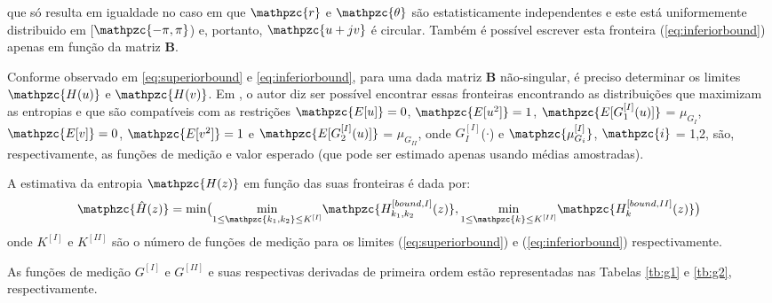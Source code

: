     que só resulta em igualdade no caso em que $\mathpzc{r}$ e $\mathpzc{\theta}$ são estatisticamente independentes e este está uniformemente distribuido em [$\mathpzc{-\pi,\pi}$) e, portanto, $\mathpzc{u + jv}$ é circular. Também é possível escrever esta fronteira (\ref{eq:inferiorbound}) apenas em função da matriz $\mathbf{B}$. 
    
    Conforme observado em \ref{eq:superiorbound} e \ref{eq:inferiorbound}, para uma dada matriz $\mathbf{B}$ não-singular, é preciso determinar os limites $\mathpzc{H(u)}$ e  $\mathpzc{H(v)}$. Em \cite{entropymaximum}, o autor diz ser possível encontrar essas fronteiras encontrando as distribuições que maximizam as entropias e que são compatíveis com as restrições $\mathpzc{E[u]} = 0$, $\mathpzc{E[u^2]} = 1$, $\mathpzc{E[G_1^{[I]}(u)]}$ = $\mu_{G_I}$, $\mathpzc{E[v]} = 0$, $\mathpzc{E[v^2]} = 1$ e $\mathpzc{E[G_2^{[I]}(u)]}$ = $\mu_{G_{II}}$, onde ${G_I^{[I]}}$($\cdot$) e $\matphzc{\mu_{G_i}^{[I]}}$, $\mathpzc{i}$ = 1,2, são, respectivamente, as funções de medição e valor esperado (que pode ser estimado apenas usando médias amostradas).
    
    A estimativa da entropia $\mathpzc{H(z)}$ em função das suas fronteiras é dada por:
    \begin{equation}
        \matphzc{\hat{H}(z)} = \text{min}\big(
        \underset{1\leq\mathpzc{k_1,k_2}\leq K^{[I]}}{\mathrm{min}}\mathpzc{H_{k_1,k_2}^{[bound,I]}(z)}
        ,
        \underset{1 \leq \mathpzc{k}\leq K^{[II]}}{\mathrm{min}}\mathpzc{H_k^{[bound,II]}(z)}
        \big)
    \end{equation}
    \bigskip
    onde ${K^{[I]}}$ e ${K^{[II]}}$ são o número de funções de medição para os limites (\ref{eq:superiorbound}) e (\ref{eq:inferiorbound}) respectivamente.
    
    As funções de medição ${G^{[I]}}$ e ${G^{[II]}}$ e suas respectivas derivadas de primeira ordem estão representadas nas Tabelas \ref{tb:g1} e \ref{tb:g2}, respectivamente. 

